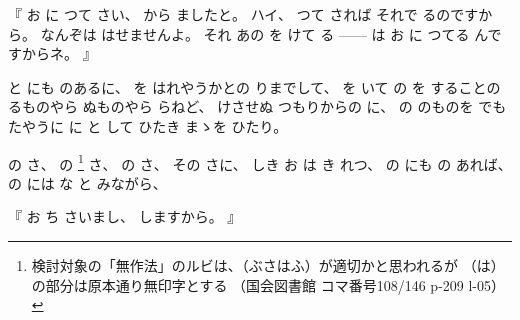 %
『
お
に
つて
さい、
%
から
ましたと。
%
ハイ、
%
つて
されば
それで
るのですから。
%
なんぞは
はせませんよ。
%
それ
あの
を
けて
る%
{---}{---}%
は
お
に
つてる
んですからネ。
』

%
と
にも
のあるに、
%
を
はれやうかとの
りまでして、%
%
を
いて
の
を
することの
るものやら
ぬものやら
らねど、
%
けさせぬ
つもりからの
に、
%
の
のものを
でも
たやうに
に
と
して
ひたき
まゝを
ひたり。

%
の
さ、
%
の
\footnote{%
検討対象の「無作法」のルビは、（ぶさはふ）が適切かと思われるが
（は）の部分は原本通り無印字とする
（国会図書館 コマ番号108/146 p-209 l-05）
}%
さ、
%
の
さ、
%
その
さに、%
%
しき
お
は
き
れつ、
%
の
にも
の
あれば、
%
の
には
な%
と
みながら、

%
『
お
ち
さいまし、
%
しますから。
』


